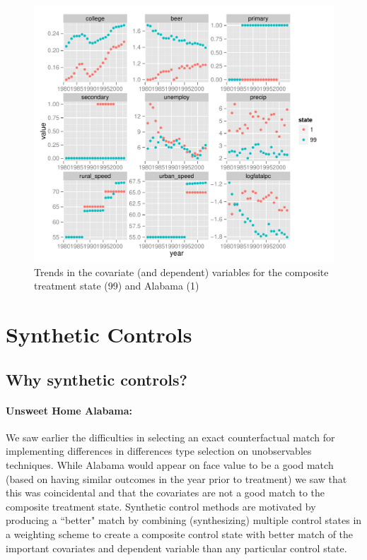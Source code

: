 \documentclass[letterpaper, 12pt]{article}
\begin{document}
\begin{figure}[htbp]
\begin{center}
\includegraphics{img-ps2b-compareStatesFacets.pdf}
\caption{Trends in the covariate (and dependent) variables for the composite treatment state (99) and Alabama (1)}
\label{fig:a22}
\end{center}
\end{figure}


\section{Synthetic Controls}

\subsection{Why synthetic controls?}

\paragraph{Unsweet Home Alabama:}
We saw earlier the difficulties in selecting an exact counterfactual match for implementing differences in differences type selection on unobservables techniques.  While Alabama would appear on face value to be a good match (based on having similar outcomes in the year prior to treatment) we saw that this was coincidental and that the covariates are not a good match to the composite treatment state.  Synthetic control methods are motivated by producing a ``better" match by combining (synthesizing) multiple control states in a weighting scheme to create a composite control state with better match of the important covariates and dependent variable than any particular control state.  
\end{document}
